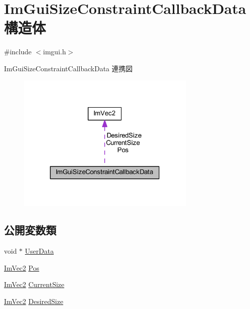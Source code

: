 \hypertarget{struct_im_gui_size_constraint_callback_data}{}\section{Im\+Gui\+Size\+Constraint\+Callback\+Data 構造体}
\label{struct_im_gui_size_constraint_callback_data}


{\ttfamily \#include $<$imgui.\+h$>$}



Im\+Gui\+Size\+Constraint\+Callback\+Data 連携図\nopagebreak
\begin{figure}[H]
\begin{center}
\leavevmode
\includegraphics[width=244pt]{struct_im_gui_size_constraint_callback_data__coll__graph}
\end{center}
\end{figure}
\subsection*{公開変数類}
\begin{DoxyCompactItemize}
\item 
void $\ast$ \mbox{\hyperlink{struct_im_gui_size_constraint_callback_data_a3b2fb1bd849f82edc78377f361433eac}{User\+Data}}
\item 
\mbox{\hyperlink{struct_im_vec2}{Im\+Vec2}} \mbox{\hyperlink{struct_im_gui_size_constraint_callback_data_ad3d81153905b00e6d513af4478d82cfd}{Pos}}
\item 
\mbox{\hyperlink{struct_im_vec2}{Im\+Vec2}} \mbox{\hyperlink{struct_im_gui_size_constraint_callback_data_ac7d5013d841044f410cba69344bdb4a1}{Current\+Size}}
\item 
\mbox{\hyperlink{struct_im_vec2}{Im\+Vec2}} \mbox{\hyperlink{struct_im_gui_size_constraint_callback_data_a1080a748a1769de07c5ae1e98de99ea3}{Desired\+Size}}
\end{DoxyCompactItemize}


